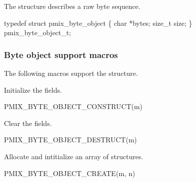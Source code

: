 The  structure describes a raw byte sequence.

\cspecificstart
\begin{codepar}
typedef struct pmix_byte_object \{
    char *bytes;
    size_t size;
\} pmix_byte_object_t;
\end{codepar}
\cspecificend

\subsubsection{Byte object support macros}
The following macros support the  structure.


Initialize the  fields.

\cspecificstart
\begin{codepar}
PMIX_BYTE_OBJECT_CONSTRUCT(m)
\end{codepar}
\cspecificend

\begin{arglist}
\end{arglist}


Clear the  fields.

\cspecificstart
\begin{codepar}
PMIX_BYTE_OBJECT_DESTRUCT(m)
\end{codepar}
\cspecificend

\begin{arglist}
\end{arglist}


Allocate and intitialize an array of  structures.

\cspecificstart
\begin{codepar}
PMIX_BYTE_OBJECT_CREATE(m, n)
\end{codepar}
\cspecificend

